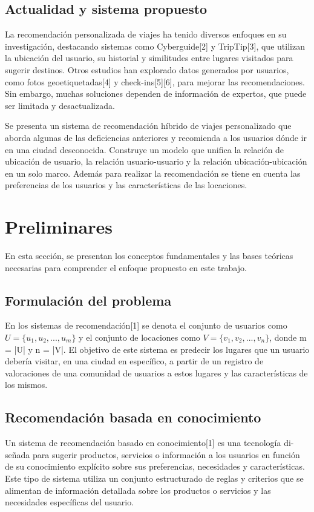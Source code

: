 \documentclass[runningheads]{llncs}
\begin{document}
\subsection{Actualidad y sistema propuesto}
La recomendación personalizada de viajes ha tenido diversos enfoques en su investigación, destacando sistemas como Cyberguide[2] y TripTip[3], que utilizan la ubicación del usuario, su historial y similitudes entre lugares visitados para sugerir destinos. Otros estudios han explorado datos generados por usuarios, como fotos geoetiquetadas[4] y check-ins[5][6], para mejorar las recomendaciones. Sin embargo, muchas soluciones dependen de información de expertos, que puede ser limitada y desactualizada.

Se presenta un sistema de recomendación híbrido de viajes personalizado que aborda algunas de las deficiencias anteriores y recomienda a los usuarios dónde ir en una ciudad desconocida. Construye un modelo que unifica la relación de ubicación de usuario, la relación usuario-usuario y la relación ubicación-ubicación en un solo marco. Además para realizar la recomendación se tiene en cuenta las preferencias de los usuarios y las características de las locaciones. 

\section{Preliminares}

En esta sección, se presentan los conceptos fundamentales y las bases teóricas necesarias para comprender el enfoque propuesto en este trabajo.

\subsection{Formulación del problema}
En los sistemas de recomendación[1] se denota el conjunto de usuarios como  $U =  \{u_1, u_2, ... ,u_m\}$ y el conjunto de locaciones como $V =  \{v_1, v_2, ... ,v_n\}$, donde m = |U| y n = |V|. El objetivo de este sistema es predecir los lugares que un usuario debería visitar, en una ciudad en específico, a partir de un registro de valoraciones de una comunidad de usuarios a estos lugares y las características de los mismos.

\subsection{Recomendación basada en conocimiento}

Un sistema de recomendación basado en conocimiento[1] es una tecnología di-\\ señada para sugerir productos, servicios o información a los usuarios en función de su conocimiento explícito sobre sus preferencias, necesidades y características. Este tipo de sistema utiliza un conjunto estructurado de reglas y criterios que se alimentan de información detallada sobre los productos o servicios y las necesidades específicas del usuario. 
\end{document}
